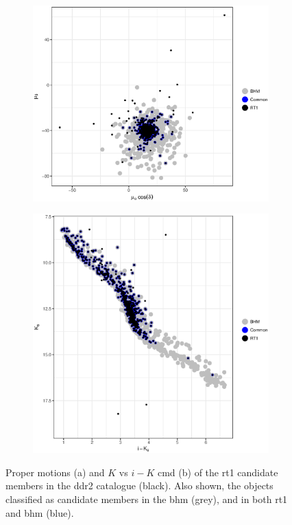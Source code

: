 \begin{figure}[ht!]
    \centering
    \begin{subfigure}[t]{0.45\textwidth}
    \centering
       \includegraphics[width=\textwidth]{background/Figures/RT1_pm.eps}
        \caption{}
    \end{subfigure}
    \begin{subfigure}[t]{0.45\textwidth}
    \centering
     \includegraphics[width=\textwidth]{background/Figures/RT1_ph.eps}
        \caption{}
    \end{subfigure}
\caption{Proper motions (a) and $K$ vs $i-K$ \gls{cmd} (b) of the \gls{rt1} candidate members in the \gls{ddr2} catalogue (black). Also shown, the objects classified as candidate members  in the \gls{bhm} (grey), and in both \gls{rt1} and \gls{bhm} (blue).}
\label{fig:RT1}
\end{figure}

